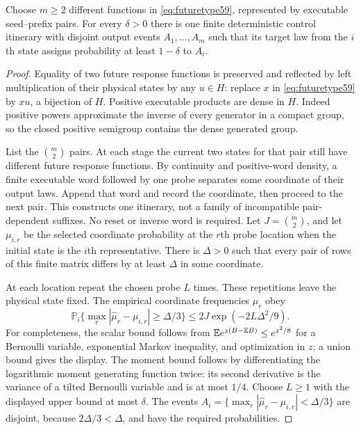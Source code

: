 \begin{lemma}\label{lem:itinerary59}
Choose $m\ge2$ different functions in \eqref{eq:futuretype59}, represented
by executable seed--prefix pairs. For every $\delta>0$ there is one
finite deterministic control itinerary with disjoint output events
$A_1,\ldots,A_m$ such that its target law from the $i$th state assigns
probability at least $1-\delta$ to $A_i$.
\end{lemma}
\begin{proof}
Equality of two future response functions is preserved and reflected by
left multiplication of their physical states by any $u\in H$: replace
$x$ in \eqref{eq:futuretype59} by $xu$, a bijection of $H$. Positive
executable products are dense in $H$. Indeed positive powers approximate
the inverse of every generator in a compact group, so the closed positive
semigroup contains the dense generated group.

List the $\binom m2$ pairs. At each stage the current two states for that
pair still have different future response functions. By continuity and
positive-word density, a finite executable word followed by one probe
separates some coordinate of their output laws. Append that word and
record the coordinate, then proceed to the next pair. This constructs
one itinerary, not a family of incompatible pair-dependent suffixes.
No reset or inverse word is required. Let $J=\binom m2$, and let
$\mu_{i,r}$ be the selected coordinate probability at the $r$th probe
location when the initial state is the $i$th representative. There is
$\Delta>0$ such that every pair of rows of this finite matrix differs
by at least $\Delta$ in some coordinate.

At each location repeat the chosen probe $L$ times. These repetitions
leave the physical state fixed. The empirical coordinate frequencies
$\widehat\mu_r$ obey
\[
 \mathbb P_i\{\max_r|\widehat\mu_r-\mu_{i,r}|\ge\Delta/3\}
       \le 2J\exp(-2L\Delta^2/9).
\]
For completeness, the scalar bound follows from
$\mathbb E e^{z(B-\mathbb E B)}\le e^{z^2/8}$ for a Bernoulli variable, exponential
Markov inequality, and optimization in $z$; a union bound gives the
display. The moment bound follows by differentiating the logarithmic
moment generating function twice: its second derivative is the variance
of a tilted Bernoulli variable and is at most $1/4$.
Choose $L\ge1$ with the displayed upper bound at most $\delta$.
The events
$A_i=\{\max_r|\widehat\mu_r-\mu_{i,r}|<\Delta/3\}$ are disjoint,
because $2\Delta/3<\Delta$, and have the required probabilities.
\end{proof}

